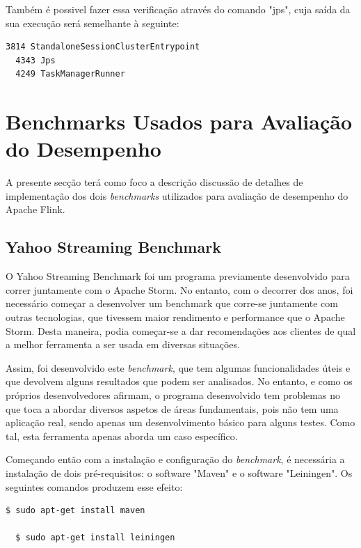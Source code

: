 \documentclass[conference]{IEEEtran}
\begin{document}
Também é possivel fazer essa verificação através do comando "jps", cuja saída da sua execução será semelhante à seguinte:

\begin{lstlisting}[language=bash]
  3814 StandaloneSessionClusterEntrypoint
  4343 Jps
  4249 TaskManagerRunner
\end{lstlisting}

\section{Benchmarks Usados para Avaliação
do Desempenho}
\label{benchmarks}

A presente secção terá como foco a descrição discussão de detalhes de implementação dos dois \emph{benchmarks} utilizados para avaliação de desempenho do Apache Flink.

\subsection{Yahoo Streaming Benchmark}
\label{yahoo}

O Yahoo Streaming Benchmark foi um programa previamente desenvolvido para correr juntamente com o Apache Storm. No entanto, com o decorrer dos anos, foi necessário começar a desenvolver um benchmark que corre-se juntamente com outras tecnologias, que tivessem maior rendimento e performance que o Apache Storm. Desta maneira, podia começar-se a dar recomendações aos clientes de qual a melhor ferramenta a ser usada em diversas situações. 

Assim, foi desenvolvido este \emph{benchmark}, que tem algumas funcionalidades úteis e que devolvem alguns resultados que podem ser analisados. No entanto, e como os próprios desenvolvedores afirmam, o programa desenvolvido tem problemas no que toca a abordar diversos aspetos de áreas fundamentais, pois não tem uma aplicação real, sendo apenas um desenvolvimento básico para alguns testes. Como tal, esta ferramenta apenas aborda um caso específico.

Começando então com a instalação e configuração do \emph{benchmark}, é necessária a instalação de dois pré-requisitos: o software "Maven" e o software "Leiningen". Os seguintes comandos produzem esse efeito:

\begin{lstlisting}[language=bash]
  $ sudo apt-get install maven
  
  $ sudo apt-get install leiningen
\end{lstlisting}
\end{document}
